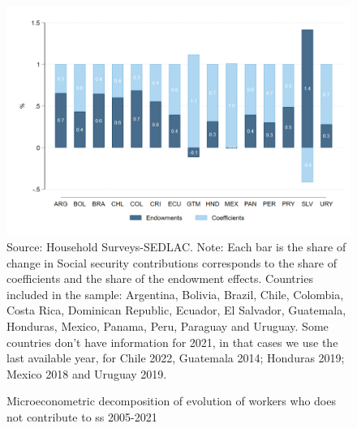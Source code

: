\documentclass[english]{article}
\begin{document}
\begin{itemize}
       \begin{figure}[!htb]
        \justifying
        \caption{Microeconometric decomposition of evolution of workers who does not contribute to ss 2005-2021}     
        \includegraphics[scale=.3]{latex/figures/Snapshot/Oaxaca decomposition share.png}
        \label{fig:Oaxaca_share}
        \footnotesize{Source: Household Surveys-SEDLAC.}
        \footnotesize{Note: Each bar is the share of change in Social security contributions corresponds to the share of coefficients and the share of the endowment effects. Countries included in the sample: Argentina, Bolivia, Brazil, Chile, Colombia, Costa Rica, Dominican Republic, Ecuador, El Salvador, Guatemala, Honduras, Mexico, Panama, Peru, Paraguay and Uruguay. Some countries don’t have information for 2021, in that cases we use the last available year, for Chile 2022, Guatemala 2014; Honduras 2019; Mexico 2018 and Uruguay 2019.}
        \end{figure}


\end{itemize}
\end{document}
